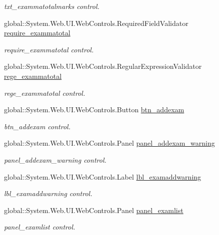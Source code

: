 \begin{DoxyCompactItemize}
\begin{DoxyCompactList}\small\item\em txt\+\_\+exammatotalmarks control. \end{DoxyCompactList}\item 
global\+::\+System.\+Web.\+U\+I.\+Web\+Controls.\+Required\+Field\+Validator \mbox{\hyperlink{class_admin__exam_add940b5e9f11fc9a0647def68070ec69}{require\+\_\+exammatotal}}
\begin{DoxyCompactList}\small\item\em require\+\_\+exammatotal control. \end{DoxyCompactList}\item 
global\+::\+System.\+Web.\+U\+I.\+Web\+Controls.\+Regular\+Expression\+Validator \mbox{\hyperlink{class_admin__exam_add929caada4c50f0f7462fa9a304e5b3}{rege\+\_\+exammatotal}}
\begin{DoxyCompactList}\small\item\em rege\+\_\+exammatotal control. \end{DoxyCompactList}\item 
global\+::\+System.\+Web.\+U\+I.\+Web\+Controls.\+Button \mbox{\hyperlink{class_admin__exam_a4f41d32477ff661b1621a64115a475f6}{btn\+\_\+addexam}}
\begin{DoxyCompactList}\small\item\em btn\+\_\+addexam control. \end{DoxyCompactList}\item 
global\+::\+System.\+Web.\+U\+I.\+Web\+Controls.\+Panel \mbox{\hyperlink{class_admin__exam_a4e8c7c73ae6ae42e875b41b1ec65a3df}{panel\+\_\+addexam\+\_\+warning}}
\begin{DoxyCompactList}\small\item\em panel\+\_\+addexam\+\_\+warning control. \end{DoxyCompactList}\item 
global\+::\+System.\+Web.\+U\+I.\+Web\+Controls.\+Label \mbox{\hyperlink{class_admin__exam_ac0c8acdb6a488f886954aeb8acd7cf06}{lbl\+\_\+examaddwarning}}
\begin{DoxyCompactList}\small\item\em lbl\+\_\+examaddwarning control. \end{DoxyCompactList}\item 
global\+::\+System.\+Web.\+U\+I.\+Web\+Controls.\+Panel \mbox{\hyperlink{class_admin__exam_a8211626ff1add9eac5593e12a230b2e3}{panel\+\_\+examlist}}
\begin{DoxyCompactList}\small\item\em panel\+\_\+examlist control. \end{DoxyCompactList}\item 

\end{DoxyCompactItemize}
